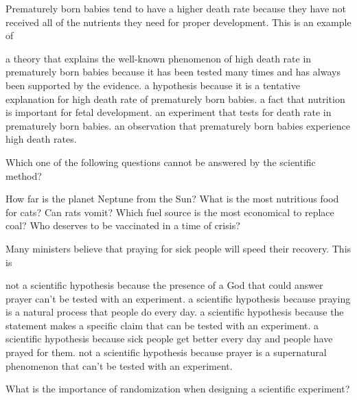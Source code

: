 \question
Prematurely born babies tend to have a higher death rate because they have not received all of the nutrients they need for proper development. This is an example of

\begin{choices}
\choice a theory that explains the well-known phenomenon of high death rate in prematurely born babies because it has been tested many times and has always been supported by the evidence.%
\choice a hypothesis because it is a tentative explanation for high death rate of prematurely born babies.%
\choice a fact that nutrition is important for fetal development.%
\choice an experiment that tests for death rate in prematurely born babies.%
\choice an observation that prematurely born babies experience high death rates.%
\end{choices}

\question
Which one of the following questions cannot be answered by the scientific method?

\begin{choices}
\choice How far is the planet Neptune from the Sun?%
\choice What is the most nutritious food for cats?%
\choice Can rats vomit?%
\choice Which fuel source is the most economical to replace coal?%
\choice Who deserves to be vaccinated in a time of crisis?%
\end{choices}

\question
Many ministers believe that praying for sick people will speed their recovery.  This is

\begin{choices}
\choice not a scientific hypothesis because the presence of a God that could answer prayer can't be tested with an experiment.%
\choice a scientific hypothesis because praying is a natural process that people do every day.%
\choice a scientific hypothesis because the statement makes a specific claim that can be tested with an experiment.%
\choice a scientific hypothesis because sick people get better every day and people have prayed for them.%
\choice not a scientific hypothesis because prayer is a supernatural phenomenon that can't be tested with an experiment.%
\end{choices}

\question
What is the importance of randomization when designing a scientific experiment?

